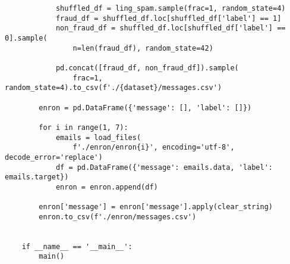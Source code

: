 \begin{lstlisting}
            shuffled_df = ling_spam.sample(frac=1, random_state=4)
            fraud_df = shuffled_df.loc[shuffled_df['label'] == 1]
            non_fraud_df = shuffled_df.loc[shuffled_df['label'] == 0].sample(
                n=len(fraud_df), random_state=42)

            pd.concat([fraud_df, non_fraud_df]).sample(
                frac=1, random_state=4).to_csv(f'./{dataset}/messages.csv')

        enron = pd.DataFrame({'message': [], 'label': []})

        for i in range(1, 7):
            emails = load_files(
                f'./enron/enron{i}', encoding='utf-8', decode_error='replace')
            df = pd.DataFrame({'message': emails.data, 'label': emails.target})
            enron = enron.append(df)

        enron['message'] = enron['message'].apply(clear_string)
        enron.to_csv(f'./enron/messages.csv')


    if __name__ == '__main__':
        main()

\end{lstlisting}
